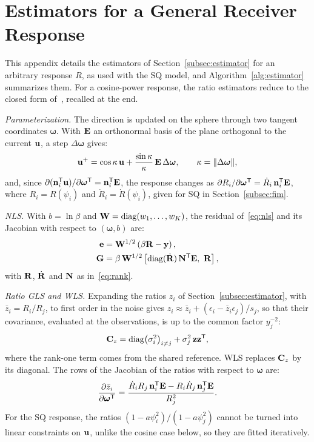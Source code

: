 \section{Estimators for a General Receiver Response}
\label{app:estimators}
This appendix details the estimators of Section~\ref{subsec:estimator} for an arbitrary response $R$, as used with the SQ model, and Algorithm~\ref{alg:estimator} summarizes them. For a cosine-power response, the ratio estimators reduce to the closed form of~\cite{Acuna2026}, recalled at the end.

\emph{Parameterization.} The direction is updated on the sphere through two tangent coordinates $\bm\omega$. With $\mathbf{E}$ an orthonormal basis of the plane orthogonal to the current $\mathbf{u}$, a step $\Delta\bm\omega$ gives:
\begin{equation}
 {\mathbf{u}^+=\cos\kappa\,\mathbf{u}+\frac{\sin\kappa}{\kappa}\,\mathbf{E}\,\Delta\bm\omega,\qquad\kappa=\lVert\Delta\bm\omega\rVert},
 \label{eq:sphere-step}
\end{equation}
and, since $\partial(\mathbf{n}_i^{\mathsf T}\mathbf{u})/\partial\bm\omega^{\mathsf T}=\mathbf{n}_i^{\mathsf T}\mathbf{E}$, the response changes as $\partial R_i/\partial\bm\omega^{\mathsf T}=\dot R_i\,\mathbf{n}_i^{\mathsf T}\mathbf{E}$, where $R_i=R(\psi_i)$ and $\dot R_i=\dot R(\psi_i)$, given for SQ in Section~\ref{subsec:fim}.

\emph{NLS.} With $b=\ln\beta$ and $\mathbf{W}=\operatorname{diag}(w_1,\ldots,w_K)$, the residual of~\eqref{eq:nls} and its Jacobian with respect to $(\bm\omega,b)$ are:
\begin{equation}
 \begin{aligned}
  \mathbf{e}&=\mathbf{W}^{1/2}\left(\beta\mathbf{R}-\mathbf{y}\right),\\
  {\mathbf{G}}&=\beta\,\mathbf{W}^{1/2}\left[\operatorname{diag}(\dot{\mathbf{R}})\,\mathbf{N}^{\mathsf T}\mathbf{E},\ \mathbf{R}\right],
 \end{aligned}
 \label{eq:nls-jacobian}
\end{equation}
with $\mathbf{R}$, $\dot{\mathbf{R}}$ and $\mathbf{N}$ as in~\eqref{eq:rank}.

\emph{Ratio GLS and WLS.} Expanding the ratios $z_i$ of Section~\ref{subsec:estimator}, with $\bar z_i=R_i/R_j$, to first order in the noise gives $z_i\approx\bar z_i+(\epsilon_i-\bar z_i\epsilon_j)/s_j$, so that their covariance, evaluated at the observations, is up to the common factor $y_j^{-2}$:
\begin{equation}
 {\mathbf{C}_z=\operatorname{diag}\!\left(\sigma_i^2\right)_{i\neq j}+\sigma_j^2\,\mathbf{z}\mathbf{z}^{\mathsf T}},
 \label{eq:ratio-cov}
\end{equation}
where the rank-one term comes from the shared reference. WLS replaces $\mathbf{C}_z$ by its diagonal. The rows of the Jacobian of the ratios with respect to $\bm\omega$ are:
\begin{equation}
 {\frac{\partial\bar z_i}{\partial\bm\omega^{\mathsf T}}}=\frac{\dot R_iR_j\,\mathbf{n}_i^{\mathsf T}\mathbf{E}-R_i\dot R_j\,\mathbf{n}_j^{\mathsf T}\mathbf{E}}{R_j^2}.
 \label{eq:ratio-jacobian}
\end{equation}
For the SQ response, the ratios $(1-a\psi_i^2)/(1-a\psi_j^2)$ cannot be turned into linear constraints on $\mathbf{u}$, unlike the cosine case below, so they are fitted iteratively.

